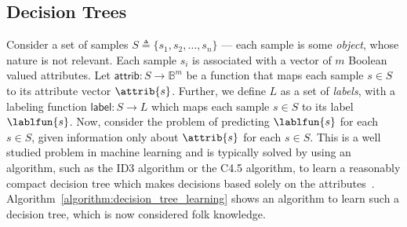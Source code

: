 \subsection{Decision Trees}
\label{subsection:decision_trees}
Consider a set of samples $S \triangleq \{s_1, s_2, \ldots, s_n\}$ ---
each sample is some \emph{object}, whose nature is not relevant. Each
sample $s_i$ is associated with a vector of $m$ Boolean valued
attributes. Let $\mathsf{attrib} : S \rightarrow \mathbb{B}^m$ be
a function that maps each sample $s \in S$ to its attribute vector
$\attrib{s}$. Further, we define $L$ as a set of \emph{labels}, with a
labeling function $\mathsf{label} : S \rightarrow L$ which maps
each sample $s \in S$ to its label $\lablfun{s}$. Now, consider the
problem of predicting $\lablfun{s}$ for each $s \in S$, given
information only about $\attrib{s}$ for each $s \in S$. This is a well
studied problem in machine learning and is typically solved by using
an algorithm, such as the ID3 algorithm or the C4.5 algorithm, to
learn a reasonably compact decision tree which makes decisions based
solely on the attributes~\cite{quinlan-86, quinlan-87, quinlan-96}.
Algorithm~\ref{algorithm:decision_tree_learning} shows an algorithm to
learn such a decision tree, which is now considered folk knowledge.


